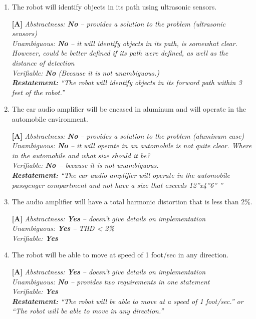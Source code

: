 \begin{enumerate}
\begin{enumerate}
  
\item
  The robot will identify objects in its path using ultrasonic sensors.
  
\begin{onlysolution}
\textbf{[A]}
 \itshape
Abstractness: \textbf{No} -- provides a solution to the problem (ultrasonic sensors)\\
Unambiguous: \textbf{No} -- it will identify objects in its path, is
somewhat clear. However, could be better defined if its path were
defined, as well as the distance of detection\\
Verifiable: \textbf{No} (Because it is not unambiguous.)\\
\textbf{Restatement:} ``The robot will identify objects in its forward
path within 3 feet of the robot.''
\end{onlysolution}

\item
  The car audio amplifier will be encased in aluminum and will operate
  in the automobile environment.
  
  \begin{onlysolution}
  \textbf{[A]}
   \itshape
Abstractness: \textbf{No} -- provides a solution to the problem (aluminum case)\\
Unambiguous: \textbf{No} -- it will operate in an automobile is not
quite clear. Where in the automobile and what size should it be?\\
Verifiable: \textbf{No --} because it is not unambiguous.\\
\textbf{Restatement:} ``The car audio amplifier will operate in the
automobile passgenger compartment and not have a size that exceeds
12''x4''6'' ''
\end{onlysolution}

\item
  The audio amplifier will have a total harmonic distortion that is less
  than 2\%.
  
  \begin{onlysolution}
  \textbf{[A]}
   \itshape
Abstractness: \textbf{Yes} -- doesn't give details on implementation \\
Unambiguous: \textbf{Yes} -- THD \textless{} 2\%  \\
Verifiable: \textbf{Yes}
\end{onlysolution}

\item
  The robot will be able to move at speed of 1 foot/sec in any
  direction.
  
  \begin{onlysolution}
  \textbf{[A]}
   \itshape
Abstractness: \textbf{Yes} -- doesn't give details on implementation \\
Unambiguous: \textbf{No} -- provides two requirements in one statement \\
Verifiable: \textbf{Yes} \\
\textbf{Restatement:} ``The robot will be able to move at a speed of 1 foot/sec.'' or
``The robot will be able to move in any direction.''
\end{onlysolution}


\end{enumerate}
\end{enumerate}
